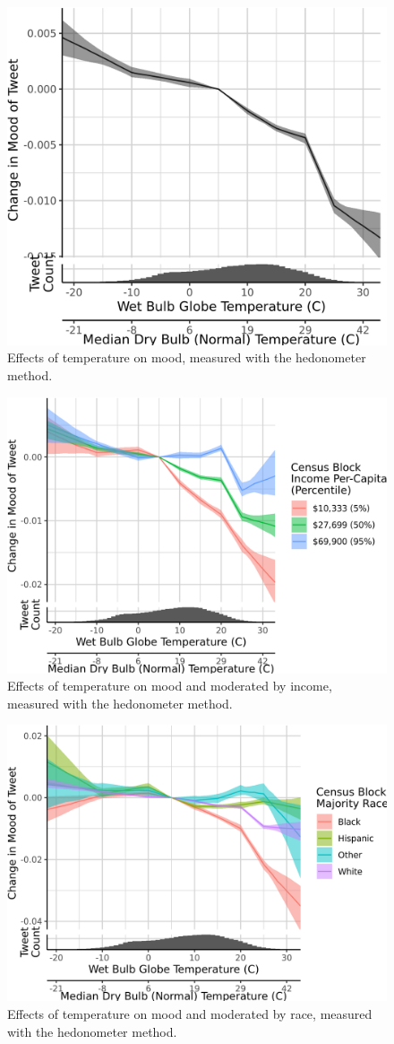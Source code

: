 \documentclass{article}
\begin{document}
\begin{figure}[H]
  \centering
  \includegraphics[width=0.6\linewidth]{../res/hedono-wbgt.png}
  \caption{Effects of temperature on mood, measured with the hedonometer method.}
\end{figure}

\begin{figure}[H]
  \centering
  \includegraphics[width=0.6\linewidth]{../res/hedono-wbgt-income.png}
  \caption{Effects of temperature on mood and moderated by income, measured with the hedonometer method.}
\end{figure}

\begin{figure}[H]
  \centering
  \includegraphics[width=0.6\linewidth]{../res/hedono-wbgt-race_q.png}
  \caption{Effects of temperature on mood and moderated by race, measured with the hedonometer method.}
\end{figure}
\end{document}

